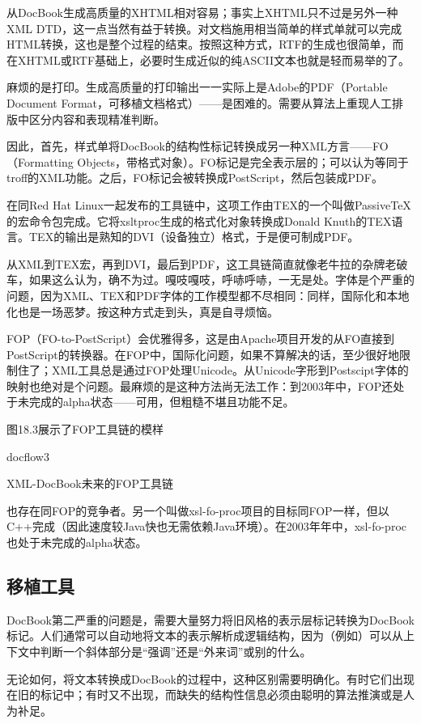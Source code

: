 \documentclass[12pt,oneside]{ctexbook}
\begin{document}
\begin{common-format}
从DocBook生成高质量的XHTML相对容易；事实上XHTML只不过是另外一种XML DTD，这一点当然有益于转换。对文档施用相当简单的样式单就可以完成HTML转换，这也是整个过程的结束。按照这种方式，RTF的生成也很简单，而在XHTML或RTF基础上，必要时生成近似的纯ASCII文本也就是轻而易举的了。

麻烦的是打印。生成高质量的打印输出一一实际上是Adobe的PDF（Portable Document Format，可移植文档格式）——是困难的。需要从算法上重现人工排版中区分内容和表现精准判断。

因此，首先，样式单将DocBook的结构性标记转换成另一种XML方言——FO（Formatting Objects，带格式对象）。FO标记是完全表示层的；可以认为等同于troff的XML功能。之后，FO标记会被转换成PostScript，然后包装成PDF。

在同Red Hat Linux一起发布的工具链中，这项工作由TEX的一个叫做PassiveTeX的宏命令包完成。它将xsltproc生成的格式化对象转换成Donald Knuth的TEX语言。TEX的输出是熟知的DVI（设备独立）格式，于是便可制成PDF。

从XML到TEX宏，再到DVI，最后到PDF，这工具链简直就像老牛拉的杂牌老破车，如果这么认为，确不为过。嘎吱嘎吱，呼哧呼哧，一无是处。字体是个严重的问题，因为XML、TEX和PDF字体的工作模型都不尽相同：同样，国际化和本地化也是一场恶梦。按这种方式走到头，真是自寻烦恼。

FOP（FO-to-PostScript）会优雅得多，这是由Apache项目开发的从FO直接到PostScript的转换器。在FOP中，国际化问题，如果不算解决的话，至少很好地限制住了；XML工具总是通过FOP处理Unicode。从Unicode字形到Postscipt字体的映射也绝对是个问题。最麻烦的是这种方法尚无法工作：到2003年中，FOP还处于未完成的alpha状态——可用，但粗糙不堪且功能不足。

图18.3展示了FOP工具链的模样
\begin{fig}{docflow3}
\caption{XML-DocBook未来的FOP工具链}
\label{fig:docflow3}
\end{fig}

也存在同FOP的竞争者。另一个叫做xsl-fo-proc项目的目标同FOP一样，但以C++完成（因此速度较Java快也无需依赖Java环境）。在2003年年中，xsl-fo-proc也处于未完成的alpha状态。

\subsection{移植工具}
DocBook第二严重的问题是，需要大量努力将旧风格的表示层标记转换为DocBook标记。人们通常可以自动地将文本的表示解析成逻辑结构，因为（例如）可以从上下文中判断一个斜体部分是“强调”还是“外来词”或别的什么。

无论如何，将文本转换成DocBook的过程中，这种区别需要明确化。有时它们出现在旧的标记中；有时又不出现，而缺失的结构性信息必须由聪明的算法推演或是人为补足。


\end{common-format}
\end{document}
